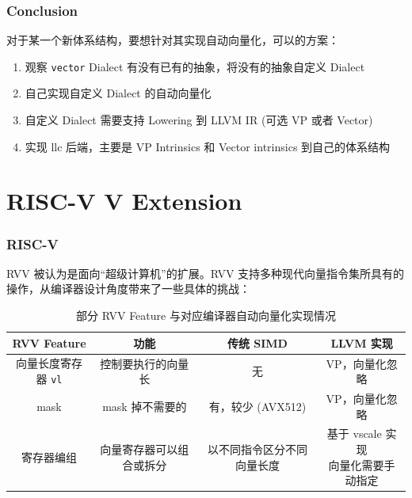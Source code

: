 \documentclass[aspectratio=169]{ctexbeamer}
\begin{document}
\begin{frame}
    \frametitle{Conclusion}

    对于某一个新体系结构，要想针对其实现自动向量化，可以的方案：

    \begin{enumerate}
        \item 观察 \texttt{vector} Dialect 有没有已有的抽象，将没有的抽象自定义 Dialect
        \item 自己实现自定义 Dialect 的自动向量化
        \item 自定义 Dialect 需要支持 Lowering 到 LLVM IR (可选 VP 或者 Vector)
        \item 实现 llc 后端，主要是 VP Intrinsics 和 Vector intrinsics 到自己的体系结构
    \end{enumerate}

\end{frame}

\section{RISC-V V Extension}

\begin{frame}
    \frametitle{RISC-V}

    RVV 被认为是面向``超级计算机''的扩展。RVV 支持多种现代向量指令集所具有的操作，从编译器设计角度带来了一些具体的挑战：

    \begin{table}
        \scriptsize
        \centering
        \caption{部分 RVV Feature 与对应编译器自动向量化实现情况}
        \begin{tabular}{cccc}
            \toprule
            RVV Feature         & 功能           & 传统 SIMD       & LLVM 实现             \\
            \midrule
            向量长度寄存器 \texttt{vl} & 控制要执行的向量长    & 无             & VP，向量化忽略            \\
            mask                & mask 掉不需要的   & 有，较少 (AVX512) & VP，向量化忽略            \\
            寄存器编组               & 向量寄存器可以组合或拆分 & 以不同指令区分不同向量长度 & \thead{基于 vscale 实现 \\ 向量化需要手动指定} \\
            \bottomrule
        \end{tabular}
    \end{table}

\end{frame}
\end{document}
